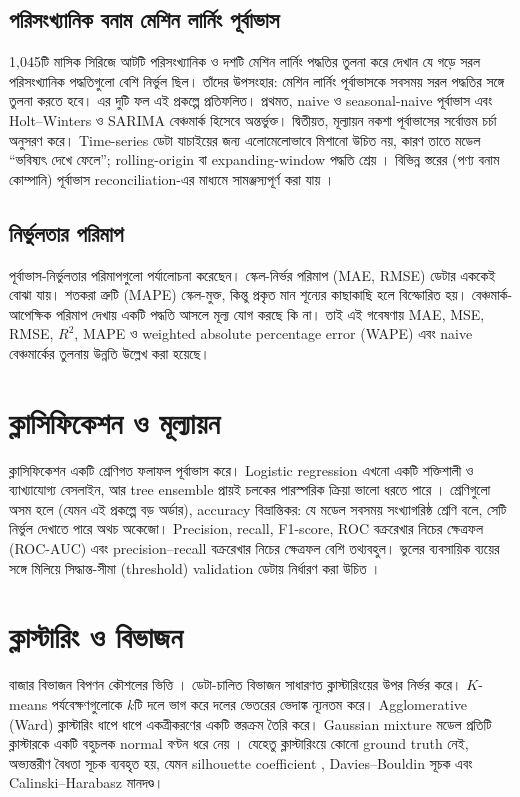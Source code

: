 \subsection{পরিসংখ্যানিক বনাম মেশিন লার্নিং পূর্বাভাস}
\citet{makridakis2018} 1,045টি মাসিক সিরিজে আটটি পরিসংখ্যানিক ও দশটি মেশিন লার্নিং পদ্ধতির তুলনা করে দেখান যে গড়ে সরল
পরিসংখ্যানিক পদ্ধতিগুলো বেশি নির্ভুল ছিল। তাঁদের উপসংহার: মেশিন লার্নিং পূর্বাভাসকে সবসময় সরল পদ্ধতির সঙ্গে তুলনা করতে হবে।
এর দুটি ফল এই প্রকল্পে প্রতিফলিত। প্রথমত, naive ও seasonal-naive পূর্বাভাস এবং Holt--Winters ও SARIMA বেঞ্চমার্ক হিসেবে
অন্তর্ভুক্ত। দ্বিতীয়ত, মূল্যায়ন নকশা পূর্বাভাসের সর্বোত্তম চর্চা অনুসরণ করে। Time-series ডেটা যাচাইয়ের জন্য এলোমেলোভাবে মিশানো
উচিত নয়, কারণ তাতে মডেল ``ভবিষ্যৎ দেখে ফেলে''; rolling-origin বা expanding-window পদ্ধতি শ্রেয় \citep{bergmeir2012,
hyndman2021}। বিভিন্ন স্তরের (পণ্য বনাম কোম্পানি) পূর্বাভাস reconciliation-এর মাধ্যমে সামঞ্জস্যপূর্ণ করা যায়
\citep{athanasopoulos2009}।

\subsection{নির্ভুলতার পরিমাপ}
\citet{hyndman2006} পূর্বাভাস-নির্ভুলতার পরিমাপগুলো পর্যালোচনা করেছেন। স্কেল-নির্ভর পরিমাপ (MAE, RMSE) ডেটার এককেই বোঝা
যায়। শতকরা ত্রুটি (MAPE) স্কেল-মুক্ত, কিন্তু প্রকৃত মান শূন্যের কাছাকাছি হলে বিস্ফোরিত হয়। বেঞ্চমার্ক-আপেক্ষিক পরিমাপ দেখায় একটি
পদ্ধতি আসলে মূল্য যোগ করছে কি না। তাই এই গবেষণায় MAE, MSE, RMSE, $R^2$, MAPE ও weighted absolute percentage error
(WAPE) এবং naive বেঞ্চমার্কের তুলনায় উন্নতি উল্লেখ করা হয়েছে।

\section{ক্লাসিফিকেশন ও মূল্যায়ন}
ক্লাসিফিকেশন একটি শ্রেণিগত ফলাফল পূর্বাভাস করে। Logistic regression এখনো একটি শক্তিশালী ও ব্যাখ্যাযোগ্য বেসলাইন, আর tree
ensemble প্রায়ই চলকের পারস্পরিক ক্রিয়া ভালো ধরতে পারে \citep{kuhn2013}। শ্রেণিগুলো অসম হলে (যেমন এই প্রকল্পে বড় অর্ডার),
accuracy বিভ্রান্তিকর: যে মডেল সবসময় সংখ্যাগরিষ্ঠ শ্রেণি বলে, সেটি নির্ভুল দেখাতে পারে অথচ অকেজো। Precision, recall,
F1-score, ROC বক্ররেখার নিচের ক্ষেত্রফল (ROC-AUC) এবং precision--recall বক্ররেখার নিচের ক্ষেত্রফল বেশি তথ্যবহুল। ভুলের
ব্যবসায়িক ব্যয়ের সঙ্গে মিলিয়ে সিদ্ধান্ত-সীমা (threshold) validation ডেটায় নির্ধারণ করা উচিত \citep{kuhn2013}।

\section{ক্লাস্টারিং ও বিভাজন}
বাজার বিভাজন বিপণন কৌশলের ভিত্তি \citep{kotler2016}। ডেটা-চালিত বিভাজন সাধারণত ক্লাস্টারিংয়ের উপর নির্ভর করে। $K$-means
পর্যবেক্ষণগুলোকে $k$টি দলে ভাগ করে দলের ভেতরের ভেদাঙ্ক ন্যূনতম করে। Agglomerative (Ward) ক্লাস্টারিং ধাপে ধাপে একত্রীকরণের
একটি স্তরক্রম তৈরি করে। Gaussian mixture মডেল প্রতিটি ক্লাস্টারকে একটি বহুচলক normal বণ্টন ধরে নেয় \citep{han2012}। যেহেতু
ক্লাস্টারিংয়ে কোনো ground truth নেই, অভ্যন্তরীণ বৈধতা সূচক ব্যবহৃত হয়, যেমন silhouette coefficient \citep{rousseeuw1987},
Davies--Bouldin সূচক \citep{davies1979} এবং Calinski--Harabasz মানদণ্ড।

